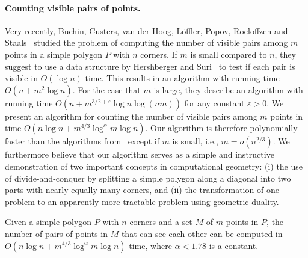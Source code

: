 \documentclass{article}
\begin{document}
\paragraph{Counting visible pairs of points.}
Very recently, Buchin, Custers, van der Hoog, Löffler, Popov, Roeloffzen and Staals~\cite{buchin2022segment} studied the problem of computing the number of visible pairs among $m$ points in a simple polygon $P$ with $n$ corners.
If $m$ is small compared to $n$, they suggest to use a data structure by Hershberger and Suri~\cite{DBLP:journals/jal/HershbergerS95} to test if each pair is visible in $O(\log n)$ time.
This results in an algorithm with running time $O(n+m^2\log n)$.
For the case that $m$ is large, they describe an algorithm with running time $O(n + m^{3/2+\varepsilon} \log n \log (nm))$ for any constant $\varepsilon>0$.
We present an algorithm for counting the number of visible pairs among $m$ points in time $O(n\log n+m^{4/3}\log^\alpha m\log n)$.
Our algorithm is therefore polynomially faster than the algorithms from~\cite{buchin2022segment} except if $m$ is small, i.e., $m=o(n^{2/3})$.
We furthermore believe that our algorithm serves as a simple and instructive demonstration of two important concepts in computational geometry:
(i) the use of divide-and-conquer by splitting a simple polygon along a diagonal into two parts with nearly equally many corners, and (ii) the transformation of one problem to an apparently more tractable problem using geometric duality.

\begin{theorem}\label{thm:count}
Given a simple polygon $P$ with $n$ corners and a set $M$ of $m$ points in $P$, the number of pairs of points in $M$ that can see each other can be computed in $O(n\log n+m^{4/3}\log^\alpha m\log n)$ time, where $\alpha<1.78$ is a constant.
\end{theorem}
\end{document}

